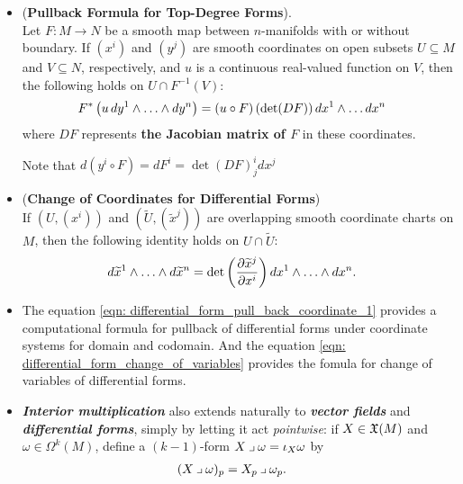 \documentclass[11pt]{article}
\begin{document}
\begin{itemize}
\item \begin{proposition}(\textbf{Pullback Formula for Top-Degree Forms}). \\
Let $F: M \rightarrow N$ be a smooth map between $n$-manifolds with or without boundary. If $(x^i)$ and $(y^j)$ are smooth coordinates on open subsets $U \subseteq M$ and $V \subseteq N$, respectively, and $u$ is a continuous real-valued function on $V$, then the following holds on $U \cap F^{-1}(V)$:
\begin{align}
F^{*}\left(u\,dy^{1} \wedge \ldots \wedge dy^{n}\right) &= (u \circ F)\,(\det(DF))\,dx^{1} \wedge \ldots dx^{n}  \label{eqn: differential_form_pull_back_coordinate_1}
\end{align}
where $DF$ represents \textbf{the Jacobian matrix of $F$} in these coordinates.
\end{proposition} Note that $d(y^i \circ F) = dF^{i} = \det(DF)_{j}^{i} dx^{j}$

\item \begin{corollary} (\textbf{Change of Coordinates for Differential Forms})\\
If $(U, (x^i))$ and $(\widetilde{U}, (\widetilde{x}^j))$ are overlapping smooth coordinate charts on $M$, then the following identity holds on $U \cap \widetilde{U}$:
\begin{align}
d\widetilde{x}^{1} \wedge \ldots \wedge d\widetilde{x}^{n} &=\det\left(\dfrac{\partial \widetilde{x}^{j}}{\partial x^i}\right) dx^1 \wedge \ldots \wedge dx^n.  \label{eqn: differential_form_change_of_variables}
\end{align}
\end{corollary}

\item \begin{remark}
The equation \eqref{eqn: differential_form_pull_back_coordinate_1} provides a computational formula for pullback of differential forms under coordinate systems for domain and codomain. And the equation \eqref{eqn: differential_form_change_of_variables} provides the fomula for change of variables of differential forms.
\end{remark}

\item \begin{definition}
\emph{\textbf{Interior multiplication}} also extends naturally to \emph{\textbf{vector fields}} and \emph{\textbf{differential forms}}, simply by letting it act \emph{pointwise}: if $X\in {\mathfrak X}(M)$ and $\omega \in \Omega^k(M)$, define a $(k-1)$-form $X \mathbin{\lrcorner }{\omega} = \iota_{X}\omega$ by
\begin{align*}
(X \mathbin{\lrcorner }{\omega})_p &= X_p \mathbin{\lrcorner }{\omega}_p.
\end{align*}
\end{definition}


\end{itemize}
\end{document}
